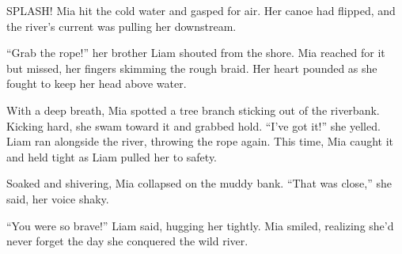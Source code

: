 \documentclass[12pt]{article}
\begin{document}
\begin{tcolorbox}[colframe=black!60, colback=white, 
coltitle=black, colbacktitle=black!15, fonttitle=\bfseries\Large, 
title=Text: The River Rescue, halign title=center, left=10pt, right=10pt, top=10pt, bottom=15pt]


SPLASH! Mia hit the cold water and gasped for air. Her canoe had flipped, and the river’s current was pulling her downstream.

“Grab the rope!” her brother Liam shouted from the shore. Mia reached for it but missed, her fingers skimming the rough braid. Her heart pounded as she fought to keep her head above water.

With a deep breath, Mia spotted a tree branch sticking out of the riverbank. Kicking hard, she swam toward it and grabbed hold. “I’ve got it!” she yelled. Liam ran alongside the river, throwing the rope again. This time, Mia caught it and held tight as Liam pulled her to safety.

Soaked and shivering, Mia collapsed on the muddy bank. “That was close,” she said, her voice shaky.

“You were so brave!” Liam said, hugging her tightly. Mia smiled, realizing she’d never forget the day she conquered the wild river.

 

\end{tcolorbox}
\end{document}
